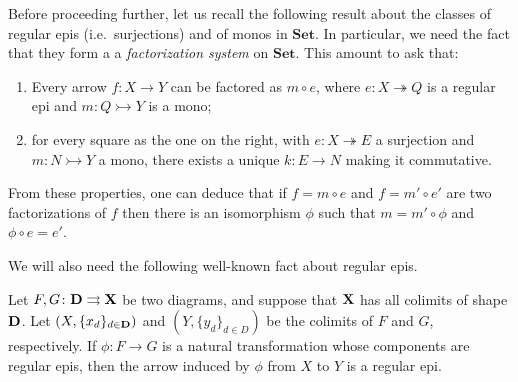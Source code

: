 \documentclass[a4paper,UKenglish,cleveref,pdftex,thm-restate,numberwithinsect]{lipics-v2021}
\newcommand{\Set}{\mathbf{Set}}
\def\D{\textbf {\textup{D}}}
\def\X{\textbf {\textup{X}}}
\newcommand{\mto}{\rightarrowtail}
\newcommand{\eto}{\twoheadrightarrow}
\begin{document}
\begin{remark}\label{rem:fact}
	Before proceeding further, let us recall the following result about the classes of regular epis (i.e.~surjections) and of monos in $\Set$. In particular, we need the fact that they form a a \emph{factorization system} \cite{kelly2006note} on $\Set$.  This amount to ask that:
	
	\noindent 
	\parbox{11.5cm}{
	\begin{enumerate} 
		\item Every arrow $f\colon X\to Y$ can be factored as $m\circ e$, where $e\colon X\eto Q$ is a regular epi and $m\colon Q\mto Y$ is a mono;
			\item for every square as the one on the right, with $e\colon X\eto E$ a surjection and $m\colon N\mto Y$ a mono, there exists a unique $k\colon E\to N$ making it commutative.
	\end{enumerate}}\hfill \parbox{2cm}{}
	
	\hspace{1pt}\newline 
	From these properties, one can deduce that if $f=m\circ e$ and $f=m'\circ e'$ are two factorizations of $f$ then there is an isomorphism $\phi$ such that $m=m'\circ \phi$ and $\phi \circ e=e'$.
\end{remark}

We will also need the following well-known fact about regular epis.

\begin{lemma}\label{lemma:nat_trans_reg_epi_canonical_arrow_reg_epi}
	Let $F,G\colon \D\rightrightarrows \X$ be two diagrams, and suppose that $\X$ has all colimits of shape $\D$. Let $(X, \{x_d\}_{d \in \D})$ and $(Y, \{y_d\}_{d\in D})$ be the colimits of $F$ and $G$, respectively.  If $\phi\colon  F \to G$ is a natural transformation whose components are regular epis, then the arrow induced by $\phi$ from $X$ to $Y$ is a regular epi.
\end{lemma}

\noindent
\parbox{11.4cm}{
\comp*}\hfill 
\parbox{2cm}{}   
\end{document}
